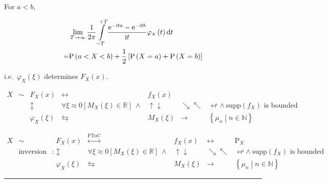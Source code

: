 \documentclass[
]{book}
\theoremstyle{definition}
\theoremstyle{definition}
\theoremstyle{definition}
\theoremstyle{definition}
\theoremstyle{remark}
\begin{document}
For \(a<b\),

\[
\begin{aligned}
 & \lim_{T\rightarrow\infty}\dfrac{1}{2\pi}\intop_{-T}^{+T}\dfrac{\mathrm{e}^{-\mathrm{i}ta}-\mathrm{e}^{-\mathrm{i}tb}}{\mathrm{i}t}\varphi_{{\scriptscriptstyle X}}\left(t\right)\mathrm{d}t\\
= & \mathrm{P}\left(a<X<b\right)+\dfrac{1}{2}\left[\mathrm{P}\left(X=a\right)+\mathrm{P}\left(X=b\right)\right]
\end{aligned}
\]

i.e.~\(\varphi_{{\scriptscriptstyle X}}\left(\xi\right)\) determines \(F_{{\scriptscriptstyle X}}\left(x\right)\).

\[
\begin{array}{ccccccc}
X & \sim & F_{{\scriptscriptstyle X}}\left(x\right) & \leftrightarrow & f_{{\scriptscriptstyle X}}\left(x\right)\\
 &  & \updownarrow & \forall\xi\approx0\left[M_{{\scriptscriptstyle X}}\left(\xi\right)\in\mathbb{R}\right]\ \wedge & \uparrow\downarrow & \searrow\nwarrow & \looparrowleft\wedge\ \mathrm{supp}\left(f_{{\scriptscriptstyle X}}\right)\text{ is bounded}\\
 &  & \varphi_{{\scriptscriptstyle X}}\left(\xi\right) & \leftrightarrows & M_{{\scriptscriptstyle X}}\left(\xi\right) & \rightarrow & \left\{ \mu_{{\scriptscriptstyle n}}\middle|n\in\mathbb{N}\right\} 
\end{array}
\]

\[
\begin{array}{ccccccc}
X & \sim & F_{{\scriptscriptstyle X}}\left(x\right) & \overset{\text{FToC}}{\longleftrightarrow} & f_{{\scriptscriptstyle X}}\left(x\right) & \leftrightarrow & \mathrm{P}_{{\scriptscriptstyle X}}\\
 & \text{inversion formula}\ : & \updownarrow & \forall\xi\approx0\left[M_{{\scriptscriptstyle X}}\left(\xi\right)\in\mathbb{R}\right]\ \wedge & \uparrow\downarrow & \searrow\nwarrow & \looparrowleft\wedge\ \mathrm{supp}\left(f_{{\scriptscriptstyle X}}\right)\text{ is bounded}\\
 &  & \varphi_{{\scriptscriptstyle X}}\left(\xi\right) & \leftrightarrows & M_{{\scriptscriptstyle X}}\left(\xi\right) & \rightarrow & \left\{ \mu_{{\scriptscriptstyle n}}\middle|n\in\mathbb{N}\right\} 
\end{array}
\]

\begin{center}\rule{0.5\linewidth}{0.5pt}\end{center}
\end{document}
